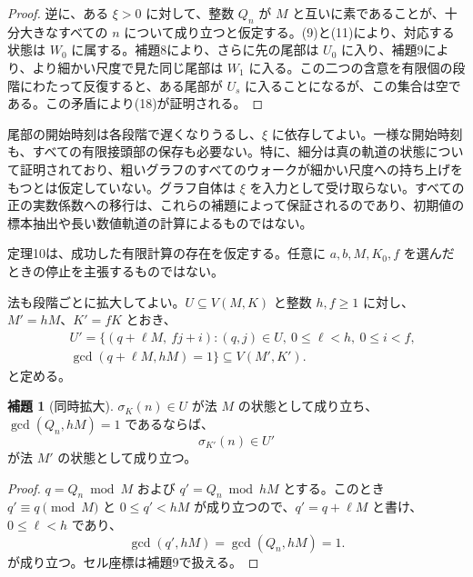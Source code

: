 \documentclass[11pt,reqno]{amsart}
\theoremstyle{definition}
\newtheorem{lemma}[theorem]{補題}
\theoremstyle{definition}
\theoremstyle{remark}
\begin{document}
\begin{proof}\leavevmode\label{proof:10}
逆に、ある \(\xi>0\) に対して、整数 \(Q_n\) が \(M\) と互いに素であることが、十分大きなすべての \(n\) について成り立つと仮定する。(9)と(11)により、対応する状態は \(W_0\) に属する。補題8により、さらに先の尾部は \(U_0\) に入り、補題9により、より細かい尺度で見た同じ尾部は \(W_1\) に入る。この二つの含意を有限個の段階にわたって反復すると、ある尾部が \(U_s\) に入ることになるが、この集合は空である。この矛盾により(18)が証明される。\qedhere
\end{proof}

尾部の開始時刻は各段階で遅くなりうるし、\(\xi\) に依存してよい。一様な開始時刻も、すべての有限接頭部の保存も必要ない。特に、細分は真の軌道の状態について証明されており、粗いグラフのすべてのウォークが細かい尺度への持ち上げをもつとは仮定していない。グラフ自体は \(\xi\) を入力として受け取らない。すべての正の実数係数への移行は、これらの補題によって保証されるのであり、初期値の標本抽出や長い数値軌道の計算によるものではない。

定理10は、成功した有限計算の存在を仮定する。任意に \(a,b,M,K_0,f\) を選んだときの停止を主張するものではない。

法も段階ごとに拡大してよい。\(U\subseteq V(M,K)\) と整数 \(h,f\ge1\) に対し、\(M'=hM\)、\(K'=fK\) とおき、
\[\begin{aligned}
&U'=\{(q+\ell M,\ fj+i):(q,j)\in U,\ 0\le\ell<h,\ 0\le i<f,\\\
&\gcd(q+\ell M,hM)=1\}\subseteq V(M',K').
\end{aligned}\]
と定める。

\begin{samepage}
\begin{lemma}[同時拡大]\leavevmode\label{thm:11}
\(\sigma_K(n)\in U\) が法 \(M\) の状態として成り立ち、\(\gcd(Q_n,hM)=1\) であるならば、
\[
\sigma_{K'}(n)\in U'
\]
が法 \(M'\) の状態として成り立つ。
\label{thm-end:11}
\end{lemma}
\end{samepage}

\begin{proof}\leavevmode\label{proof:11}
\(q=Q_n\bmod M\) および \(q'=Q_n\bmod hM\) とする。このとき \(q'\equiv q\pmod M\) と \(0\le q'<hM\) が成り立つので、\(q'=q+\ell M\) と書け、\(0\le\ell<h\) であり、
\[
\gcd(q',hM)=\gcd(Q_n,hM)=1.
\]
が成り立つ。セル座標は補題9で扱える。\qedhere
\end{proof}
\end{document}
